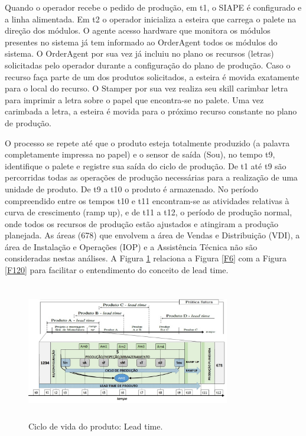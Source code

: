 \documentclass[10pt,letterpaper,twocolumn]{IEEEtran}
\begin{document}
					Quando o operador recebe o pedido de produção, em t1, o SIAPE é configurado e a linha alimentada. Em t2 o operador inicializa a esteira que carrega o palete na direção dos módulos. O agente acesso hardware que monitora os módulos presentes no sistema já tem informado ao OrderAgent todos os módulos do sistema. O OrderAgent por sua vez já incluiu no plano os recursos (letras) solicitadas pelo operador durante a configuração do plano de produção. Caso o recurso faça parte de um dos produtos solicitados, a esteira é movida exatamente para o local do recurso. O Stamper por sua vez realiza seu skill carimbar letra para imprimir a letra sobre o papel que encontra-se no palete. Uma vez carimbada a letra, a esteira é movida para o próximo recurso constante no plano de produção.\par 
					O processo se repete até que o produto esteja totalmente produzido (a palavra completamente impressa no papel)  e o sensor de saída (Sou), no tempo t9,  identifique o palete e registre sua saída do ciclo de produção. De t1 até t9 são percorridas todas as operações de produção necessárias para a realização de uma unidade de produto. De t9 a t10 o produto é armazenado. No período compreendido entre os tempos t10 e t11 encontram-se as atividades relativas à curva de crescimento (ramp up), e de t11 a t12, o período de produção normal, onde todos os recursos de produção estão ajustados e atingiram a produção planejada. As áreas (678) que envolvem a área de Vendas e Distribuição (VDI), a área de Instalação e Operações (IOP) e a Assistência Técnica não são consideradas nestas análises. A Figura   \ref{F120_2} relaciona a Figura \ref{F6} com a Figura \ref{F120} para facilitar o entendimento do conceito de lead time.
					
					
					\begin{figure}[h]
						\centering
						\includegraphics[width=8.9cm, height=6cm]{MeDSE_imagens/F120_2_SIAPE_CICLO_EXPLODIDO.jpg} 
						\caption{Ciclo de vida do produto: Lead time.}
						\label{F120_2}
					\end{figure}
					
\end{document}
